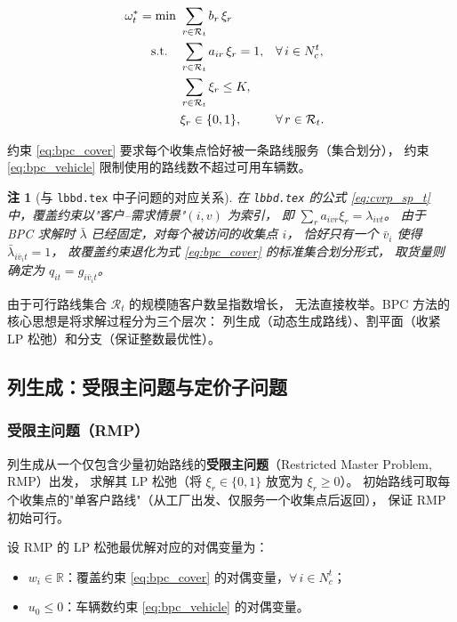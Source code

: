 \documentclass{article}
\newtheorem{remark}{注}
\begin{document}
\begin{align}
\omega_t^* = \min\ & \sum_{r \in \mathcal{R}_t} b_r\,\xi_r \notag \\
\text{s.t.}\quad
& \sum_{r \in \mathcal{R}_t} a_{ir}\,\xi_r = 1, && \forall\, i \in N_c^t, \label{eq:bpc_cover} \\
& \sum_{r \in \mathcal{R}_t} \xi_r \le K, \label{eq:bpc_vehicle} \\
& \xi_r \in \{0,1\}, && \forall\, r \in \mathcal{R}_t. \label{eq:bpc_integrality}
\end{align}

约束 \eqref{eq:bpc_cover} 要求每个收集点恰好被一条路线服务（集合划分），
约束 \eqref{eq:bpc_vehicle} 限制使用的路线数不超过可用车辆数。

\begin{remark}[与 \texttt{lbbd.tex} 中子问题的对应关系]
在 \texttt{lbbd.tex} 的公式 \eqref{eq:cvrp_sp_t} 中，覆盖约束以"客户--需求情景"$(i,v)$ 为索引，
即 $\sum_r a_{ivr}\xi_r = \lambda_{ivt}$。
由于 BPC 求解时 $\bar\lambda$ 已经固定，对每个被访问的收集点 $i$，
恰好只有一个 $\bar v_i$ 使得 $\bar\lambda_{i\bar v_i t} = 1$，
故覆盖约束退化为式 \eqref{eq:bpc_cover} 的标准集合划分形式，
取货量则确定为 $q_{it} = g_{i\bar v_i t}$。
\end{remark}

由于可行路线集合 $\mathcal{R}_t$ 的规模随客户数呈指数增长，
无法直接枚举。BPC 方法的核心思想是将求解过程分为三个层次：
列生成（动态生成路线）、割平面（收紧 LP 松弛）和分支（保证整数最优性）。

\subsection{列生成：受限主问题与定价子问题}
\label{sec:column_generation}

\subsubsection{受限主问题（RMP）}

列生成从一个仅包含少量初始路线的\textbf{受限主问题}（Restricted Master Problem, RMP）出发，
求解其 LP 松弛（将 $\xi_r \in \{0,1\}$ 放宽为 $\xi_r \ge 0$）。
初始路线可取每个收集点的"单客户路线"（从工厂出发、仅服务一个收集点后返回），
保证 RMP 初始可行。

设 RMP 的 LP 松弛最优解对应的对偶变量为：
\begin{itemize}[leftmargin=2em]
  \item $w_i \in \mathbb{R}$：覆盖约束 \eqref{eq:bpc_cover} 的对偶变量，$\forall\, i \in N_c^t$；
  \item $u_0 \le 0$：车辆数约束 \eqref{eq:bpc_vehicle} 的对偶变量。
\end{itemize}
\end{document}
